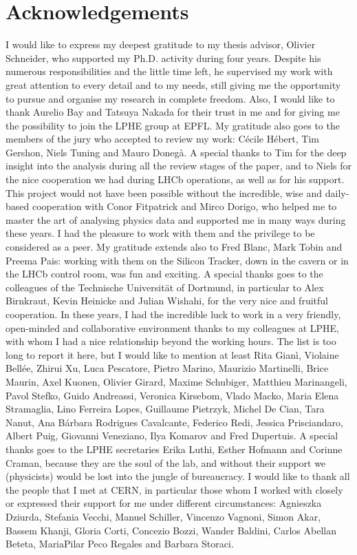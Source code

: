 \chapter*{Acknowledgements}
\vskip0.2cm
I would like to express my deepest gratitude to my thesis advisor, Olivier Schneider, 
who supported my Ph.D. activity during four years. Despite his numerous
responsibilities and the little time left, he supervised my work with 
great attention to every detail and to my needs, still giving me the
opportunity to pursue and organise my research in complete freedom.
Also, I would like to thank
Aurelio Bay and Tatsuya Nakada for their trust in me
and for giving me the possibility to join the LPHE group at EPFL.
My gratitude also goes to the members of the jury who accepted to review my
work: C\'ecile H\'ebert, Tim Gershon, Niels Tuning and Mauro Doneg\`a.
A special thanks to Tim for the deep insight into the analysis during all the review stages of the paper,
and to Niels for the nice cooperation we had during LHCb operations, as well as for his support.   
This project would not have been possible without the incredible, wise and daily-based cooperation with 
Conor Fitpatrick and Mirco Dorigo, who helped me to master the art of analysing physics data
and supported me in many ways during these years. 
I had the pleasure to work with them and the privilege to be considered as a peer.
My gratitude extends also to Fred Blanc, Mark Tobin and Preema Pais:
working with them on the Silicon Tracker, down in the cavern or in the LHCb control room, was
fun and exciting.
A special thanks goes to the colleagues of the Technische Universit\"at of Dortmund, in particular to
Alex Birnkraut, Kevin Heinicke and Julian Wishahi, for the very nice and fruitful
cooperation. 
In these years, I had the incredible luck to work in a very friendly, open-minded and
collaborative environment thanks to my colleagues at LPHE, with whom I had a nice relationship beyond the working hours. 
The list is too long to report it here, but I would like to mention at least Rita Gian\`i, Violaine Bell\'ee, 
Zhirui Xu, Luca Pescatore, Pietro Marino, Maurizio Martinelli, Brice Maurin, Axel Kuonen, Olivier Girard, Maxime Schubiger,
Matthieu Marinangeli, Pavol Stefko, Guido Andreassi, Veronica Kirsebom, Vlado Macko, Maria Elena Stramaglia, 
Lino Ferreira Lopes, Guillaume Pietrzyk, Michel De Cian, Tara Nanut, Ana B\'arbara Rodrigues Cavalcante, 
Federico Redi, Jessica Prisciandaro, Albert Puig, Giovanni Veneziano, Ilya Komarov and Fred Dupertuis.
A special thanks goes to the LPHE secretaries Erika Luthi, Esther Hofmann and Corinne Craman, because they are the soul
of the lab, and without their support we (physicists) would be lost into the jungle of bureaucracy.  
I would like to thank all the people that I met at CERN, in particular those whom
I worked with closely or expressed their support for me under different circumstances:
Agnieszka Dziurda, Stefania Vecchi, Manuel Schiller, Vincenzo Vagnoni, Simon Akar, Bassem Khanji, Gloria Corti,
Concezio Bozzi, Wander Baldini, Carlos Abellan Beteta, MariaPilar Peco Regales and Barbara Storaci.  

